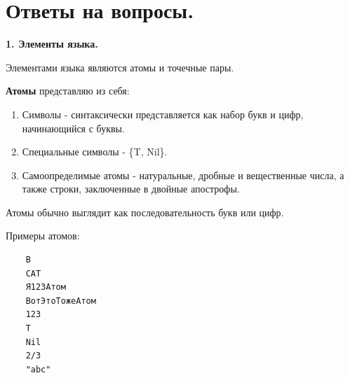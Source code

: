 \chapter{Ответы на вопросы.}







	
	

\textbf{1. Элементы языка.}

Элементами языка являются атомы и точечные пары.

\textbf{Атомы} представляю из себя:
\begin{enumerate}
	\item Символы - синтаксически представляется как набор букв и цифр, начинающийся с буквы.
	\item Специальные символы - \{T, Nil\}.
	\item Самоопределимые атомы - натуральные, дробные и вещественные числа, а также строки, заключенные в двойные апострофы. 
\end{enumerate}

Атомы обычно выглядит как последовательность букв или цифр.

Примеры атомов:
\begin{lstlisting}
	B
	CAT
	Я123Атом
	ВотЭтоТожеАтом
	123
	T
	Nil
	2/3
	"abc"
\end{lstlisting}

